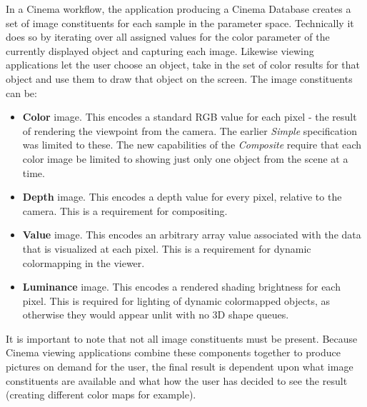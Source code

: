 \documentclass{article}
\newcommand{\Composite} {\textit{Composite}\xspace}
\begin{document}
In a Cinema workflow, the application producing a Cinema Database creates a set of image constituents for each sample in the parameter space. Technically it does so by iterating over all assigned values for the color parameter of the currently displayed object and capturing each image. Likewise viewing applications let the user choose an object, take in the set of color results for that object and use them to draw that object on the screen. The image constituents can be:
\begin{itemize}
\item \textbf{Color} image. This encodes a standard RGB value for each pixel - the result of rendering the viewpoint from the camera. The earlier \textit{Simple} specification was limited to these. The new capabilities of the \Composite require that each color image be limited to showing just only one object from the scene at a time.
\item \textbf{Depth} image. This encodes a depth value for every pixel, relative to the camera. This is a requirement for compositing.
\item \textbf{Value} image. This encodes an arbitrary array value associated with the data that is visualized at each pixel. This is a requirement for dynamic colormapping in the viewer.
\item \textbf{Luminance} image. This encodes a rendered shading brightness for each pixel. This is required for lighting of dynamic colormapped objects, as otherwise they would appear unlit with no 3D shape queues.
\end{itemize}
It is important to note that not all image constituents must be present. Because Cinema viewing applications combine these components together to produce pictures on demand for the user, the final result is dependent upon what image constituents are available and what how the user has decided to see the result (creating different color maps for example).
\end{document}
